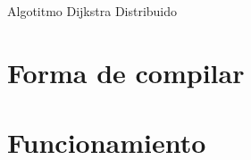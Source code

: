 \documentclass[a4paper,12pt]{article}
\begin{document}

\newpage



\newpage

\begin{center}
    {\Large Algotitmo Dijkstra Distribuido}
\end{center}

\section*{Forma de compilar}

\section*{Funcionamiento}
\end{document}
